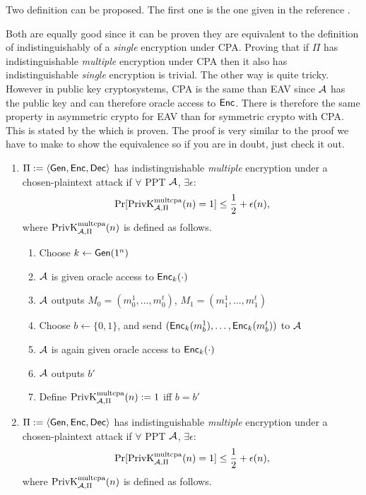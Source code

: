 \begin{solution}
  Two definition can be proposed.
  The first one is the one given in the reference \cite[p.~84]{katz2007introduction}.

  Both are equally good since it can be proven they are equivalent to the definition of indistinguishably of a \emph{single} encryption
  under CPA.
  Proving that if $\Pi$ has indistinguishable \emph{multiple} encryption under CPA then it also has indistinguishable \emph{single} encryption
  is trivial.
  The other way is quite tricky.
  However in public key cryptosystems, CPA is the same than EAV since $\mathcal{A}$ has the public key and can therefore oracle access to $\operatorname{\mathsf{Enc}}$.
  There is therefore the same property in asymmetric crypto for EAV than for symmetric crypto with CPA.
  This is stated by the \cite[theorem~10.10]{katz2007introduction} which is proven.
  The proof is very similar to the proof we have to make to show the equivalence so if you are in doubt, just check it out.

  \begin{enumerate}

    \item
      $\Pi := \langle\operatorname{\mathsf{Gen}}, \operatorname{\mathsf{Enc}}, \operatorname{\mathsf{Dec}}\rangle$ has indistinguishable \emph{multiple} encryption under a chosen-plaintext attack
      if $\forall$ PPT $\mathcal{A}$, $\exists \epsilon$:
      \[ \Pr[\operatorname{PrivK}^{\text{multcpa}}_{\mathcal{A},\Pi}(n) = 1] \leq \frac{1}{2} + \epsilon(n), \]
      where $\operatorname{PrivK}^{\text{multcpa}}_{\mathcal{A},\Pi}(n)$ is defined as follows.
      \begin{enumerate}
        \item Choose $k \leftarrow \operatorname{\mathsf{Gen}}(1^n)$
        \item $\mathcal{A}$ is given oracle access to $\operatorname{\mathsf{Enc}}_k(\cdot)$
        \item $\mathcal{A}$ outputs $M_0 = (m_0^1, \ldots, m_0^t)$, $M_1 = (m_1^1, \ldots, m_1^t)$
        \item Choose $b \leftarrow \{0,1\}$, and send $(\operatorname{\mathsf{Enc}}_k(m_b^1), \ldots, \operatorname{\mathsf{Enc}}_k(m_b^t))$ to $\mathcal{A}$
        \item $\mathcal{A}$ is again given oracle access to $\operatorname{\mathsf{Enc}}_k(\cdot)$
        \item $\mathcal{A}$ outputs $b'$
        \item Define $\operatorname{PrivK}^{\text{multcpa}}_{\mathcal{A},\Pi}(n) := 1$ iff $b = b'$
      \end{enumerate}
	

    \item
      $\Pi := \langle\operatorname{\mathsf{Gen}}, \operatorname{\mathsf{Enc}}, \operatorname{\mathsf{Dec}}\rangle$ has indistinguishable \emph{multiple} encryption under a chosen-plaintext attack
      if $\forall$ PPT $\mathcal{A}$, $\exists \epsilon$:
      \[ \Pr[\operatorname{PrivK}^{\text{multcpa}}_{\mathcal{A},\Pi}(n) = 1] \leq \frac{1}{2} + \epsilon(n), \]
      where $\operatorname{PrivK}^{\text{multcpa}}_{\mathcal{A},\Pi}(n)$ is defined as follows.
      

\end{enumerate}
\end{solution}

